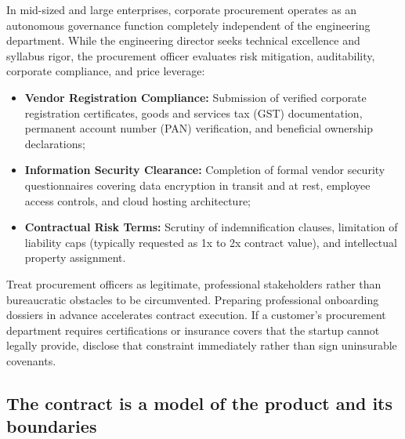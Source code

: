 In mid-sized and large enterprises, corporate procurement operates as an autonomous governance function completely independent of the engineering department. While the engineering director seeks technical excellence and syllabus rigor, the procurement officer evaluates risk mitigation, auditability, corporate compliance, and price leverage:
\begin{itemize}
\item \textbf{Vendor Registration Compliance:} Submission of verified corporate registration certificates, goods and services tax (GST) documentation, permanent account number (PAN) verification, and beneficial ownership declarations;
\item \textbf{Information Security Clearance:} Completion of formal vendor security questionnaires covering data encryption in transit and at rest, employee access controls, and cloud hosting architecture;
\item \textbf{Contractual Risk Terms:} Scrutiny of indemnification clauses, limitation of liability caps (typically requested as 1x to 2x contract value), and intellectual property assignment.
\end{itemize}
Treat procurement officers as legitimate, professional stakeholders rather than bureaucratic obstacles to be circumvented. Preparing professional onboarding dossiers in advance accelerates contract execution. If a customer's procurement department requires certifications or insurance covers that the startup cannot legally provide, disclose that constraint immediately rather than sign uninsurable covenants.

\subsection{The contract is a model of the product and its boundaries}

